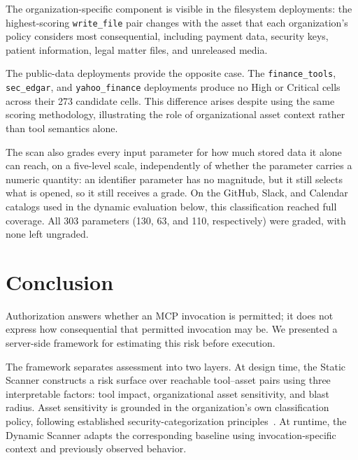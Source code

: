 \documentclass[sigconf]{acmart}
\begin{document}
The organization-specific component is visible in the filesystem deployments:
the highest-scoring \texttt{write\_file} pair changes with the asset that
each organization's policy considers most consequential, including payment
data, security keys, patient information, legal matter files, and unreleased
media.

The public-data deployments provide the opposite case. The
\texttt{finance\_tools}, \texttt{sec\_edgar}, and
\texttt{yahoo\_finance} deployments produce no High or Critical cells across
their 273 candidate cells. This difference arises despite using the same
scoring methodology, illustrating the role of organizational asset context
rather than tool semantics alone.

The scan also grades every input parameter for how much stored data it alone
can reach, on a five-level scale, independently of whether the parameter
carries a numeric quantity: an identifier parameter has no magnitude, but it
still selects what is opened, so it still receives a grade. On the GitHub,
Slack, and Calendar catalogs used in the dynamic evaluation below, this
classification reached full coverage. All 303 parameters (130, 63, and 110,
respectively) were graded, with none left ungraded.









\section{Conclusion}
\label{sec:conclusion}

Authorization answers whether an MCP invocation is permitted; it does not
express how consequential that permitted invocation may be. We presented a
server-side framework for estimating this risk before execution.

The framework separates assessment into two layers. At design time, the Static
Scanner constructs a risk surface over reachable tool--asset pairs using
three interpretable factors: tool impact, organizational asset sensitivity,
and blast radius. Asset sensitivity is grounded in the organization's own
classification policy, following established security-categorization
principles~\cite{nist2004fips199,nist2008sp80060}. At runtime, the Dynamic
Scanner adapts the corresponding baseline using invocation-specific context
and previously observed behavior.
\end{document}
